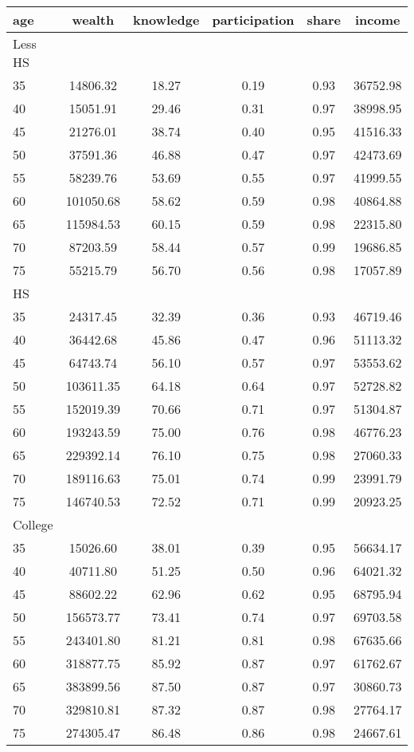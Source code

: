  \begin{tabular}{lccccc}
 \hline \hline
  age & wealth & knowledge & participation & share & income \\
 \hline
 Less HS & & & & & \\
 \hline
35 &  14806.32 &     18.27 &      0.19 &      0.93 &  36752.98 \\ 
40 &  15051.91 &     29.46 &      0.31 &      0.97 &  38998.95 \\ 
45 &  21276.01 &     38.74 &      0.40 &      0.95 &  41516.33 \\ 
50 &  37591.36 &     46.88 &      0.47 &      0.97 &  42473.69 \\ 
55 &  58239.76 &     53.69 &      0.55 &      0.97 &  41999.55 \\ 
60 & 101050.68 &     58.62 &      0.59 &      0.98 &  40864.88 \\ 
65 & 115984.53 &     60.15 &      0.59 &      0.98 &  22315.80 \\ 
70 &  87203.59 &     58.44 &      0.57 &      0.99 &  19686.85 \\ 
75 &  55215.79 &     56.70 &      0.56 &      0.98 &  17057.89 \\ 
 \hline
 HS & & & & & \\
 \hline
35 &  24317.45 &     32.39 &      0.36 &      0.93 &  46719.46 \\ 
40 &  36442.68 &     45.86 &      0.47 &      0.96 &  51113.32 \\ 
45 &  64743.74 &     56.10 &      0.57 &      0.97 &  53553.62 \\ 
50 & 103611.35 &     64.18 &      0.64 &      0.97 &  52728.82 \\ 
55 & 152019.39 &     70.66 &      0.71 &      0.97 &  51304.87 \\ 
60 & 193243.59 &     75.00 &      0.76 &      0.98 &  46776.23 \\ 
65 & 229392.14 &     76.10 &      0.75 &      0.98 &  27060.33 \\ 
70 & 189116.63 &     75.01 &      0.74 &      0.99 &  23991.79 \\ 
75 & 146740.53 &     72.52 &      0.71 &      0.99 &  20923.25 \\ 
 \hline
 College & & & & & \\
 \hline
35 &  15026.60 &     38.01 &      0.39 &      0.95 &  56634.17 \\ 
40 &  40711.80 &     51.25 &      0.50 &      0.96 &  64021.32 \\ 
45 &  88602.22 &     62.96 &      0.62 &      0.95 &  68795.94 \\ 
50 & 156573.77 &     73.41 &      0.74 &      0.97 &  69703.58 \\ 
55 & 243401.80 &     81.21 &      0.81 &      0.98 &  67635.66 \\ 
60 & 318877.75 &     85.92 &      0.87 &      0.97 &  61762.67 \\ 
65 & 383899.56 &     87.50 &      0.87 &      0.97 &  30860.73 \\ 
70 & 329810.81 &     87.32 &      0.87 &      0.98 &  27764.17 \\ 
75 & 274305.47 &     86.48 &      0.86 &      0.98 &  24667.61 \\ 
 \hline \hline
 \end{tabular}
